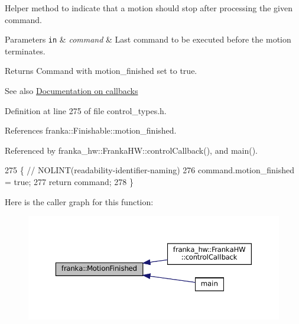 Helper method to indicate that a motion should stop after processing the given command.


\begin{DoxyParams}[1]{Parameters}
\mbox{\tt in}  & {\em command} & Last command to be executed before the motion terminates.\\
\hline
\end{DoxyParams}
\begin{DoxyReturn}{Returns}
Command with motion\+\_\+finished set to true.
\end{DoxyReturn}
\begin{DoxySeeAlso}{See also}
\hyperlink{classfranka_1_1Robot_callback-docs}{Documentation on callbacks} 
\end{DoxySeeAlso}


Definition at line 275 of file control\+\_\+types.\+h.



References franka\+::\+Finishable\+::motion\+\_\+finished.



Referenced by franka\+\_\+hw\+::\+Franka\+H\+W\+::control\+Callback(), and main().


\begin{DoxyCode}
275                                                         \{  \textcolor{comment}{// NOLINT(readability-identifier-naming)}
276   command.motion\_finished = \textcolor{keyword}{true};
277   \textcolor{keywordflow}{return} command;
278 \}
\end{DoxyCode}
Here is the caller graph for this function\+:
\nopagebreak
\begin{figure}[H]
\begin{center}
\leavevmode
\includegraphics[width=350pt]{namespacefranka_a20791f7142d78bbbe3c957cc66a23ade_icgraph}
\end{center}
\end{figure}
\mbox{\label{namespacefranka_a7f505509951b6568b08b3aec8ffb9098}} 
